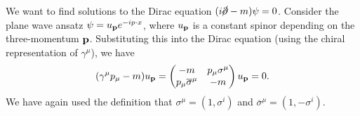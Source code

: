 We want to find solutions to the Dirac equation $(i \cancel{\partial} - m) \psi = 0$. Consider the plane wave ansatz $\psi = u_{\vb{p}} e^{-i p \cdot x}$, where $u_{\vb{p}}$ is a constant spinor depending on the three-momentum $\vb{p}$.
Substituting this into the Dirac equation (using the chiral representation of $\gamma^{\mu}$), we have
\begin{equation}
  \label{eq:16-star}
  (\gamma^{\mu} p_{\mu} - m) u_{\vb{p}} =  
  \begin{pmatrix}
   -m & p_{\mu}\sigma^{\mu} \\
   p_{\mu} \overline{\sigma}^{\mu} & -m \\
  \end{pmatrix}
  u_{\vb{p}} = 0.
\end{equation}
We have again used the definition that $\sigma^{\mu} = (1, \sigma^{i})$ and $\overline{\sigma}^{\mu} = (1, - \sigma^{i})$.

